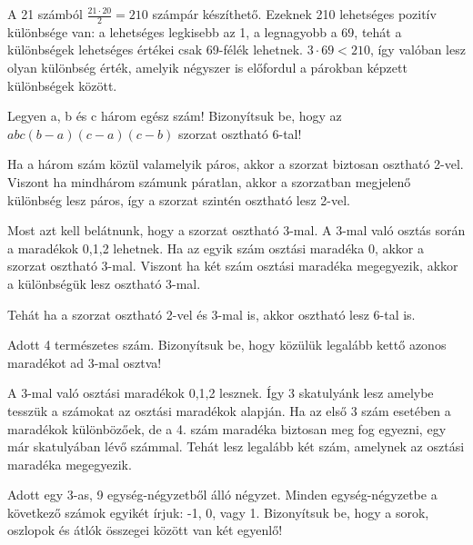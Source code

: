 \begin{solution}
	A 21 számból $\frac{21\cdot20}{2}=210$ számpár készíthető. Ezeknek
	210 lehetséges pozitív különbsége van: a lehetséges legkisebb az 1,
	a legnagyobb a 69, tehát a különbségek lehetséges értékei csak 69-félék
	lehetnek. $3\cdot69<210$, így valóban lesz olyan különbség érték,
	amelyik négyszer is előfordul a párokban képzett különbségek között. 
\end{solution}
\begin{problem}
	Legyen a, b és c három egész szám! Bizonyítsuk be, hogy az $abc(b-a)(c-a)(c-b)$
	szorzat osztható 6-tal! \\
	
\end{problem}

\begin{solution}
	Ha a három szám közül valamelyik páros, akkor a szorzat biztosan osztható
	2-vel. Viszont ha mindhárom számunk páratlan, akkor a szorzatban megjelenő
	különbség lesz páros, így a szorzat szintén osztható lesz 2-vel.
	
	Most azt kell belátnunk, hogy a szorzat osztható 3-mal. A 3-mal való
	osztás során a maradékok 0,1,2 lehetnek. Ha az egyik szám osztási
	maradéka 0, akkor a szorzat osztható 3-mal. Viszont ha két szám osztási
	maradéka megegyezik, akkor a különbségük lesz osztható 3-mal.
	
	Tehát ha a szorzat osztható 2-vel és 3-mal is, akkor osztható lesz
	6-tal is. 
\end{solution}
\begin{problem}
	Adott 4 természetes szám. Bizonyítsuk be, hogy közülük legalább kettő
	azonos maradékot ad 3-mal osztva! \\
	
\end{problem}

\begin{solution}
	A 3-mal való osztási maradékok 0,1,2 lesznek. Így 3 skatulyánk lesz
	amelybe tesszük a számokat az osztási maradékok alapján. Ha az első
	3 szám esetében a maradékok különbözőek, de a 4. szám maradéka biztosan
	meg fog egyezni, egy már skatulyában lévő számmal. Tehát lesz legalább
	két szám, amelynek az osztási maradéka megegyezik. 
\end{solution}
\begin{problem}
	Adott egy 3-as, 9 egység-négyzetből álló négyzet. Minden
	egység-négyzetbe a következő számok egyikét írjuk: -1, 0, vagy 1.
	Bizonyítsuk be, hogy a sorok, oszlopok és átlók összegei között van
	két egyenlő! \\
	
\end{problem}

